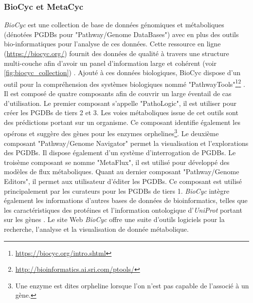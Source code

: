 \begin{refsegment}
    \subsubsection{BioCyc et MetaCyc}
    
    \textit{BioCyc} \cite{caspi2006metacyc,caspi2007metacyc,caspi2008metacyc,caspi2010metacyc,caspi2012metacyc,caspi2013metacyc,caspi2014metacyc,caspi2015metacyc,caspi2016metacyc} est une collection de base de données génomiques et métaboliques (dénotées PGDBs pour "Pathway/Genome DataBases") avec en plus des outils bio-informatiques pour l'analyse de ces données. Cette ressource en ligne (\url{https://biocyc.org/}) fournit des données de qualité à travers une structure multi-couche afin d'avoir un panel d'information large et cohérent (voir \cref{fig:biocyc_collection}) . Ajouté à ces données biologiques, BioCyc dispose d'un outil pour la compréhension des systèmes biologiques nommé  "PathwayTools"\footnote{\url{https://biocyc.org/intro.shtml}}\footnote{\url{http://bioinformatics.ai.sri.com/ptools/}} \cite{karpe2011pathway,karp2015pathway}. Il est composé de quatre composants afin de couvrir un large éventail de cas d'utilisation. Le premier composant s'appelle "PathoLogic", il est utiliser pour créer les PGDBs de tiers 2 et 3. Les voies métaboliques issue de cet outils sont des prédictions portant sur un organisme. Ce composant identifie également les opérons \cite{romero2004using} et suggère des gènes pour les enzymes orphelines\footnote{Une enzyme est dites orpheline lorsque l'on n'est pas capable de l'associé à un gène.}\cite{Green2004}. Le deuxième composant "Pathway/Genome Navigator" permet la visualisation et l'explorations des PGDBs. Il dispose également d'un système d'interrogation de PGDBs. Le troisème composant se nomme "MetaFlux", il est utilisé pour développé des modèles de flux métaboliques. Quant au dernier composant "Pathway/Genome Editors", il permet aux utilisateur d'éditer les PGDBs. Ce composant est utilisé principalement par les curateurs pour les PGDBs de tiers 1. \textit{BioCyc} intègre également les informations d'autres bases de données de bioinformatics, telles que les caractéristiques des protéines et l'information ontologique d'\textit{UniProt} portant sur les gènes . Le site Web \textit{BioCyc} offre une suite d'outils logiciels pour la recherche, l'analyse et la visualisation de donnée métabolique.
    

\end{refsegment}
